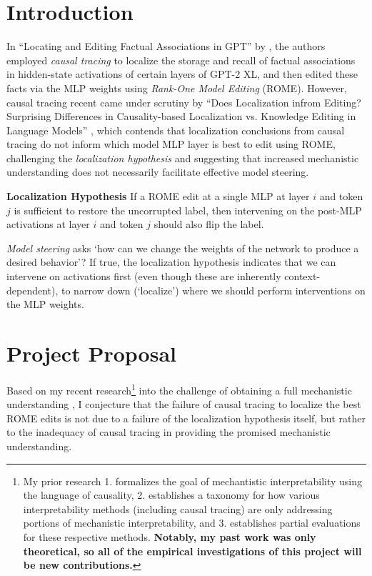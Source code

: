 \documentclass{article}
\begin{document}
\section{Introduction}

In ``Locating and Editing Factual Associations in GPT'' by \citet{meng2022locating}, the authors employed \emph{causal tracing} to localize the storage and recall of factual associations in hidden-state activations of certain layers of GPT-2 XL, and then edited these facts via the MLP weights using \emph{Rank-One Model Editing} (ROME). However, causal tracing recent came under scrutiny by ``Does Localization infrom Editing? Surprising Differences in Causality-based Localization vs. Knowledge Editing in Language Models'' \cite{hase2023does}, which contends that localization conclusions from causal tracing do not inform which model MLP layer is best to edit using ROME, challenging the \emph{localization hypothesis} and suggesting that increased mechanistic understanding does not necessarily facilitate effective model steering. 

\begin{definition} {\textbf{Localization Hypothesis}}
  If a ROME edit at a single MLP at layer $i$ and token $j$ is sufficient to restore the uncorrupted label, then intervening on the post-MLP activations at layer $i$ and token $j$ should also flip the label.
\end{definition}

\emph{Model steering} asks `how can we change the weights of the network to produce a desired behavior'? If true, the localization hypothesis indicates that we can intervene on activations first (even though these are inherently context-dependent), to narrow down (`localize') where we should perform interventions on the MLP weights.

\section{Project Proposal}

Based on my recent research\footnote{My prior research 1. formalizes the goal of mechantistic interpretability using the language of causality, 2. establishes a taxonomy for how various interpretability methods (including causal tracing) are only addressing portions of mechanistic interpretability, and 3. establishes partial evaluations for these respective methods. \textbf{Notably, my past work was only theoretical, so all of the empirical investigations of this project will be new contributions.}} into the challenge of obtaining a full mechanistic understanding \cite{reber2023whatsyourusecase}, I conjecture that the failure of causal tracing to localize the best ROME edits is not due to a failure of the localization hypothesis itself, but rather to the inadequacy of causal tracing in providing the promised mechanistic understanding. 
\end{document}
